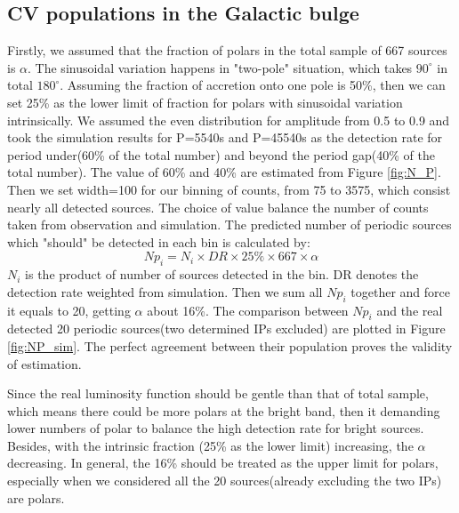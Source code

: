 \documentclass[fleqn,usenatbib]{mnras}
\begin{document}
\subsection{CV populations in the Galactic bulge}
Firstly, we assumed that the fraction of polars in the total sample of 667 sources is $\alpha$. The sinusoidal variation happens in "two-pole" situation, which takes $90^\circ$ in total $180^\circ$. Assuming the fraction of accretion onto one pole is 50\%, then we can set 25\% as the lower limit of fraction for polars with sinusoidal variation intrinsically. We assumed the even distribution for amplitude from 0.5 to 0.9 and took the simulation results for P=5540s and P=45540s as the detection rate for period under(60\% of the total number) and beyond the period gap(40\% of the total number). The value of 60\% and 40\% are estimated from Figure \ref{fig:N_P}. Then we set width=100 for our binning of counts, from 75 to 3575, which consist nearly all detected sources. The choice of value balance the number of counts taken from observation and simulation. 
 The predicted number of periodic sources which "should" be detected in each bin is calculated by:
\begin{equation}
Np_{i}=N_i\times DR \times 25\% \times 667 \times \alpha	
\end{equation}
$N_i$ is the product of number of sources detected in the bin. DR denotes the detection rate weighted from simulation. Then we sum all $Np_{i}$ together and force it equals to 20,  getting $\alpha$ about 16\%. The comparison between $Np_{i}$ and the real detected 20 periodic sources(two determined IPs excluded) are plotted in Figure \ref{fig:NP_sim}. The perfect agreement between their population proves the validity of estimation.

Since the real luminosity function should be gentle than that of  total sample, which means there could be more polars at the bright band, then it demanding lower numbers of polar to balance the high detection rate for bright sources. Besides, with the intrinsic fraction (25\% as the lower limit) increasing, the $\alpha$ decreasing.
In general, the 16\% should be treated as the upper limit for polars, especially when we considered all the 20 sources(already excluding the two IPs) are polars. 
\end{document}
